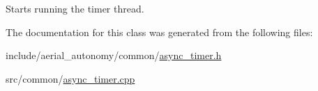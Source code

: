 Starts running the timer thread. 



The documentation for this class was generated from the following files\-:\begin{DoxyCompactItemize}
\item 
include/aerial\-\_\-autonomy/common/\hyperlink{async__timer_8h}{async\-\_\-timer.\-h}\item 
src/common/\hyperlink{async__timer_8cpp}{async\-\_\-timer.\-cpp}\end{DoxyCompactItemize}
